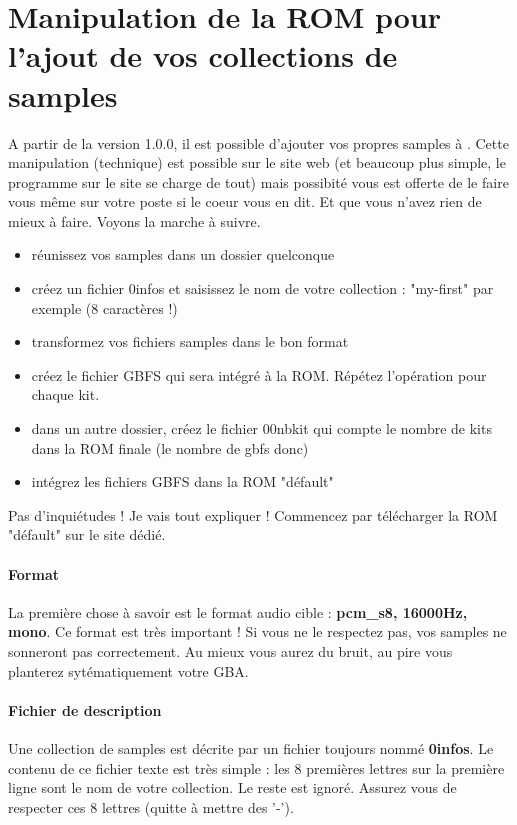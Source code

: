 \documentclass[12pt,a4paper]{article}
\begin{document}
    \newpage
    \section{Manipulation de la ROM pour l'ajout de vos collections de samples}

    A partir de la version 1.0.0, il est possible d'ajouter vos propres samples à \FAT.
    Cette manipulation (technique) est possible sur le site web (et beaucoup plus simple, le programme sur le site se charge de tout)
    mais possibité vous est offerte de le faire vous même sur votre poste si le coeur vous en dit. Et que vous n'avez rien de mieux à faire.
    Voyons la marche à suivre.
    \medskip

    \begin{itemize}
      \item{réunissez vos samples dans un dossier quelconque}
      \item{créez un fichier 0infos et saisissez le nom de votre collection : "my-first" par exemple (8 caractères !) }
      \item{transformez vos fichiers samples dans le bon format}
      \item{créez le fichier GBFS qui sera intégré à la ROM. Répétez l'opération pour chaque kit.}
      \item{dans un autre dossier, créez le fichier 00nbkit qui compte le nombre de kits dans la ROM finale (le nombre de gbfs donc)}
      \item{intégrez les fichiers GBFS dans la ROM "défault"}
    \end{itemize}\medskip

    Pas d'inquiétudes ! Je vais tout expliquer !
    Commencez par télécharger la ROM "défault" sur le site dédié.

    \paragraph{Format} La première chose à savoir est le format audio cible : {\bf pcm\_s8, 16000Hz, mono}.
    Ce format est très important ! Si vous ne le respectez pas, vos samples ne sonneront pas correctement.
    Au mieux vous aurez du bruit, au pire vous planterez sytématiquement votre GBA.

    \paragraph{Fichier de description} Une collection de samples est décrite par un fichier toujours nommé {\bf 0infos}.
    Le contenu de ce fichier texte est très simple : les 8 premières lettres sur la première ligne sont le nom de votre collection.
    Le reste est ignoré. Assurez vous de respecter ces 8 lettres (quitte à mettre des '-').
\end{document}
